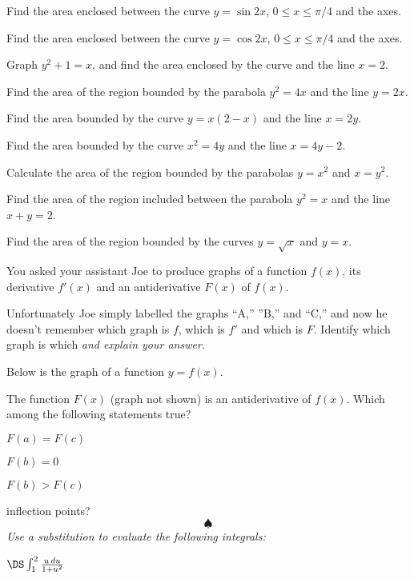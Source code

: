 \begin{multicols}{2}
\problem Find the area enclosed between the curve $y=\sin 2x$, $0\le x\le \pi/4$
and the axes.

\problem Find the area enclosed between the curve $y=\cos 2x$, $0\le x\le \pi/4$
and the axes.

\problem Graph $y^2+1=x$, and find the area enclosed by the curve and the line
$x=2$.

\problem Find the area of the region bounded by the parabola $y^2=4x$ and the
line $y=2x$.

\problem Find the area bounded by the curve $y=x(2-x)$ and the line $x=2y$.

\problem Find the area bounded by the curve $x^2=4y$ and the line $x=4y-2$.

\problem Calculate the area of the region bounded by the parabolas $y=x^2$ and
$x=y^2$.

\problem Find the area of the region included between the parabola $y^2=x$ and
the line $x+y=2$.

\problem Find the area of the region bounded by the curves $y=\sqrt{x}$ and
$y=x$.

\problem \groupproblem You asked your assistant Joe to produce graphs of a function $f(x)$,
its derivative $f'(x)$ and an antiderivative $F(x)$ of $f(x)$.

Unfortunately Joe simply labelled the graphs ``A,'' ''B,'' and ``C,''
and now he doesn't remember which graph is $f$, which is $f'$ and which
is $F$.  Identify which graph is which \emph{and explain your answer.}
\begin{center}
  
\end{center}

\problem \groupproblem Below is the graph of a function $y=f(x)$.
\begin{center}
  
\end{center}
The function $F(x)$ (graph not shown) is an antiderivative of $f(x)$.
Which among the following statements true?

\subprob $F(a)=F(c)$ 

\subprob $F(b)=0$ 

\subprob $F(b)>F(c)$ 

\subprob inflection points?
\[
\spadesuit
\]
\begingroup\itshape
Use a substitution to evaluate the following integrals:
\endgroup



\problem  \(\DS \int_1^2\frac{u\, d u}{1+u^2}\)


\end{multicols}
